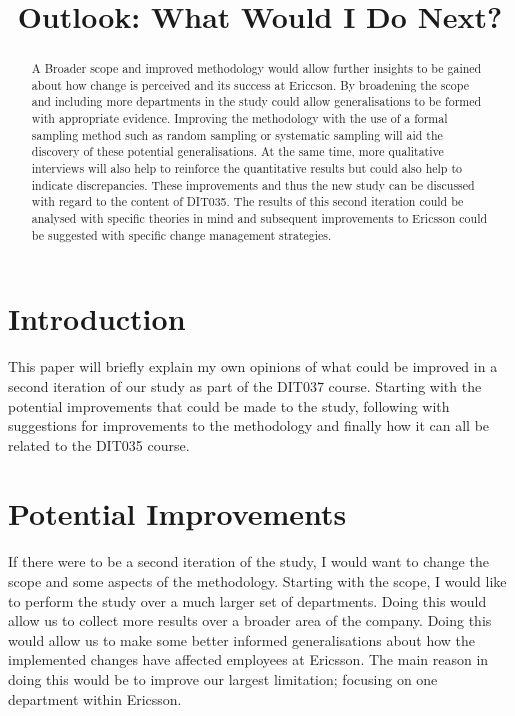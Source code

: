 \documentclass[conference]{IEEEtran}
\begin{document}
%
\title{Outlook: What Would I Do Next?}

\author{

}

\maketitle

\begin{abstract}
A Broader scope and improved methodology would allow further insights to be gained about how change is perceived and its success at Ericcson. By broadening the scope and including more departments in the study could allow  generalisations to be formed with appropriate evidence. Improving the methodology with the use of a formal sampling method such as random sampling or systematic sampling will aid the discovery of these potential generalisations. At the same time, more qualitative interviews will also help to reinforce the quantitative results but could also help to indicate discrepancies. These improvements and thus the new study can be discussed with regard to the content of DIT035. The results of this second iteration could be analysed with specific theories in mind and subsequent improvements to Ericsson could be suggested with specific change management strategies.
\end{abstract}

\IEEEpeerreviewmaketitle

\section{Introduction}

This paper will briefly explain my own opinions of what could be improved in a second iteration of our study as part of the DIT037 course. Starting with the potential improvements that could be made to the study, following with suggestions for improvements to the methodology and finally how it can all be related to the DIT035 course.

\section{Potential Improvements}

If there were to be a second iteration of the study, I would want to change the scope and some aspects of the methodology. Starting with the scope, I 
would like to perform the study over a much larger set of departments. Doing this would allow us to collect more results over a broader area of the company.
Doing this would allow us to make some better informed generalisations about 
how the implemented changes have affected employees at Ericsson. The main reason in doing this would be to improve our largest limitation; focusing on one department within Ericsson.
\end{document}
